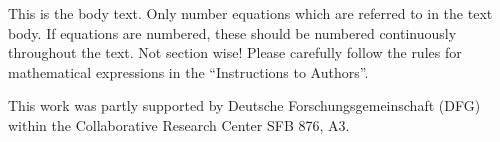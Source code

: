 \documentclass[bimj,fleqn]{w-art}
\theoremstyle{plain}
\theoremstyle{definition}
\begin{document}
\noindent This is the body text. Only number equations which are referred to in the text body. If equations
are numbered, these should be numbered continuously throughout the text. Not section wise! Please
carefully follow the rules for mathematical expressions in the ``Instructions to Authors''.

\begin{acknowledgement}
This work was partly supported by Deutsche Forschungsgemeinschaft (DFG) within the Collaborative Research Center SFB 876, A3.
\end{acknowledgement}
\vspace*{1pc}










\newpage
\phantom{aaaa}
\end{document}
